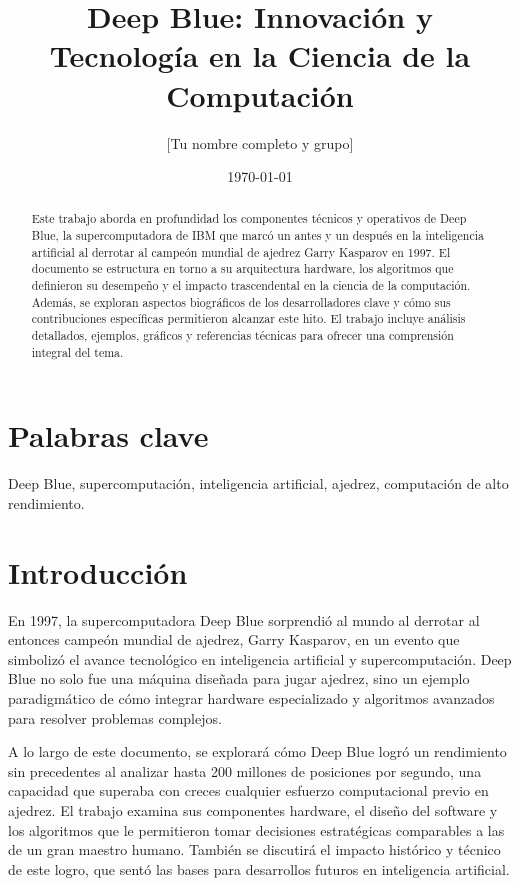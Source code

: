 \documentclass[12pt,a4paper]{article}
\title{Deep Blue: Innovación y Tecnología en la Ciencia de la Computación}
\author{[Tu nombre completo y grupo]}
\date{\today}
\begin{document}
\maketitle

\begin{abstract}
Este trabajo aborda en profundidad los componentes técnicos y operativos de Deep Blue, la supercomputadora de IBM que marcó un antes y un después en la inteligencia artificial al derrotar al campeón mundial de ajedrez Garry Kasparov en 1997. El documento se estructura en torno a su arquitectura hardware, los algoritmos que definieron su desempeño y el impacto trascendental en la ciencia de la computación. Además, se exploran aspectos biográficos de los desarrolladores clave y cómo sus contribuciones específicas permitieron alcanzar este hito. El trabajo incluye análisis detallados, ejemplos, gráficos y referencias técnicas para ofrecer una comprensión integral del tema.
\end{abstract}

\section*{Palabras clave}
Deep Blue, supercomputación, inteligencia artificial, ajedrez, computación de alto rendimiento.

\section{Introducción}
En 1997, la supercomputadora Deep Blue sorprendió al mundo al derrotar al entonces campeón mundial de ajedrez, Garry Kasparov, en un evento que simbolizó el avance tecnológico en inteligencia artificial y supercomputación. Deep Blue no solo fue una máquina diseñada para jugar ajedrez, sino un ejemplo paradigmático de cómo integrar hardware especializado y algoritmos avanzados para resolver problemas complejos. 

A lo largo de este documento, se explorará cómo Deep Blue logró un rendimiento sin precedentes al analizar hasta 200 millones de posiciones por segundo, una capacidad que superaba con creces cualquier esfuerzo computacional previo en ajedrez. El trabajo examina sus componentes hardware, el diseño del software y los algoritmos que le permitieron tomar decisiones estratégicas comparables a las de un gran maestro humano. También se discutirá el impacto histórico y técnico de este logro, que sentó las bases para desarrollos futuros en inteligencia artificial.
\end{document}
